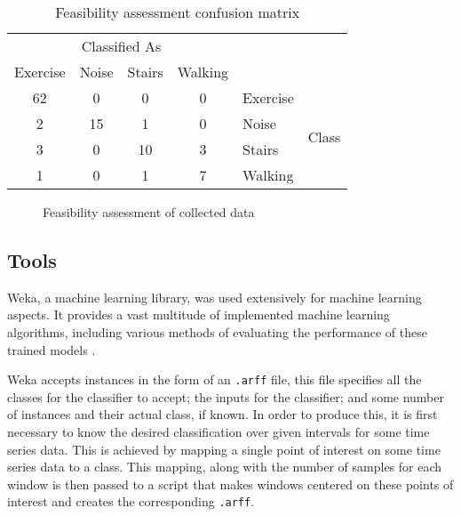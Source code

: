\begin{table}
	\centering
	\begin{tabular}{|cccc|ll|}
		\hline
		\multicolumn{4}{|c|}{Classified As}   &          &                        \\
		Exercise & Noise & Stairs & Walking &          &                        \\
		\hline
		62       & 0     & 0      & 0       & Exercise & \multirow{4}{*}{Class} \\
		2        & 15    & 1      & 0       & Noise    &                        \\
		3        & 0     & 10     & 3       & Stairs   &                        \\
		1        & 0     & 1      & 7       & Walking  &                       \\
		\hline
	\end{tabular}
	\caption{Feasibility assessment confusion matrix \label{tab:first-confusion}}
\end{table}

\begin{figure}
	\centering
	\caption{Feasibility assessment of collected data \label{fig:first-data}}
\end{figure}


\subsection{Tools \label{sec:tools}}
Weka, a machine learning library, was used extensively for machine learning aspects. It provides a vast multitude of implemented machine learning algorithms, including various methods of evaluating the performance of these trained models \cite{holmes1994weka}.

Weka accepts instances in the form of an \texttt{.arff} file, this file specifies all the classes for the classifier to accept; the inputs for the classifier; and some number of instances and their actual class, if known. In order to produce this, it is first necessary to know the desired classification over given intervals for some time series data. This is achieved by mapping a single point of interest on some time series data to a class. This mapping, along with the number of samples for each window is then passed to a script that makes windows centered on these points of interest and creates the corresponding \texttt{.arff}.

